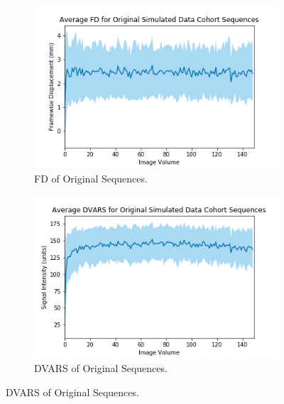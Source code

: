 \begin{figure}[t]
	\centering
	\begin{subfigure}{0.4\textwidth}
		\centering
		\includegraphics[width=1.0\textwidth]{6/figures/spectr-bold-fd-150.png}
		\caption{FD of Original Sequences.}
	\end{subfigure}
	\hspace{0.05\textwidth}
	\begin{subfigure}{0.4\textwidth}
		\centering
		\includegraphics[width=1.0\textwidth]{6/figures/spectr-bold-dvars-150.png}
		\caption{DVARS of Original Sequences.}
	\end{subfigure}
	

\end{figure}
